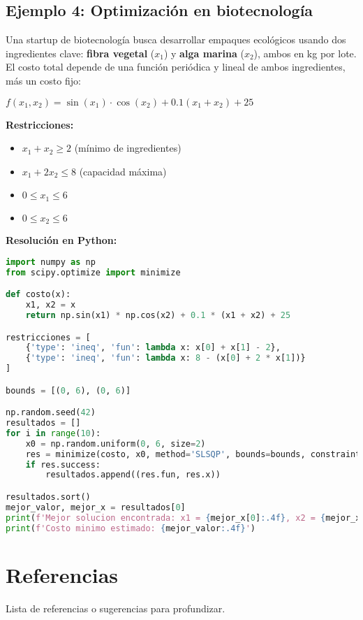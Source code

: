 \documentclass[12pt]{article}
\begin{document}
\vspace{1em}

\subsection{Ejemplo 4: Optimización en biotecnología}

Una startup de biotecnología busca desarrollar empaques ecológicos usando dos ingredientes clave: \textbf{fibra vegetal} ($x_1$) y \textbf{alga marina} ($x_2$), ambos en kg por lote. El costo total depende de una función periódica y lineal de ambos ingredientes, más un costo fijo:

\begin{center}
$\displaystyle f(x_1, x_2) = \sin(x_1) \cdot \cos(x_2) + 0.1(x_1 + x_2) + 25$
\end{center}

\textbf{Restricciones:}
\begin{itemize}
    \item $x_1 + x_2 \geq 2$ (mínimo de ingredientes)
    \item $x_1 + 2x_2 \leq 8$ (capacidad máxima)
    \item $0 \leq x_1 \leq 6$
    \item $0 \leq x_2 \leq 6$
\end{itemize}

\textbf{Resolución en Python:}

\begin{lstlisting}[language=Python]
import numpy as np
from scipy.optimize import minimize

def costo(x):
    x1, x2 = x
    return np.sin(x1) * np.cos(x2) + 0.1 * (x1 + x2) + 25

restricciones = [
    {'type': 'ineq', 'fun': lambda x: x[0] + x[1] - 2},
    {'type': 'ineq', 'fun': lambda x: 8 - (x[0] + 2 * x[1])}
]

bounds = [(0, 6), (0, 6)]

np.random.seed(42)
resultados = []
for i in range(10):
    x0 = np.random.uniform(0, 6, size=2)
    res = minimize(costo, x0, method='SLSQP', bounds=bounds, constraints=restricciones)
    if res.success:
        resultados.append((res.fun, res.x))

resultados.sort()
mejor_valor, mejor_x = resultados[0]
print(f'Mejor solucion encontrada: x1 = {mejor_x[0]:.4f}, x2 = {mejor_x[1]:.4f}')
print(f'Costo minimo estimado: {mejor_valor:.4f}')
\end{lstlisting}

\section{Referencias}
Lista de referencias o sugerencias para profundizar.
\end{document}
